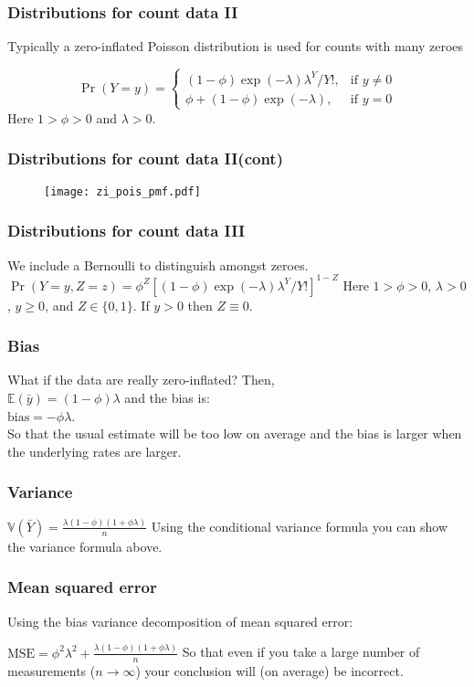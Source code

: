 \documentclass{beamer} %
\theoremstyle{definition} %
\begin{document}
\begin{frame}
\frametitle{Distributions for count data II}
Typically a zero-inflated Poisson distribution is used for counts with many zeroes

$$ \Pr(Y=y)=
\begin{cases}
(1-\phi)\exp(-\lambda)\lambda^Y/Y!, &\text{if }y\neq0 \\
\phi+(1-\phi)\exp(-\lambda), &\text{if }y=0
\end{cases}
$$
Here $1 > \phi > 0$ and $\lambda >0$.
\end{frame}

\begin{frame}
\frametitle{Distributions for count data II(cont)}
\begin{figure}[htb]
\hspace{-.45in}\texttt{[image: zi\_pois\_pmf.pdf]}
\end{figure}
\end{frame}


\begin{frame}
\frametitle{Distributions for count data III}
We include a Bernoulli to distinguish amongst zeroes. \\ 
\vspace{.5in}
$ \Pr(Y=y, Z=z)=
\phi^Z\left[(1-\phi)\exp(-\lambda)\lambda^Y/Y! \right]^{1-Z} 
$ \vspace{.5in}
Here $1 > \phi > 0$, $\lambda >0$, $y \geq 0$, and $Z \in \{0,1\}$. 
If $y>0$ then $Z\equiv0$. 
\end{frame}

\begin{frame}
\frametitle{Bias}
What if the data are really zero-inflated? Then, \\
\pause
$\mathbb{E}(\bar{y}) = (1-\phi)\lambda$ and the bias is: \\
\pause
$\text{bias} = -\phi\lambda$.\\
\pause
So that the usual estimate will be too low on average and the bias is larger when the underlying rates are larger. 
\end{frame}

\begin{frame}
\frametitle{Variance}
$
\mathbb{V}(\bar{Y}) = \frac{\lambda(1-\phi)(1+\phi\lambda)}{n}
$
Using the conditional variance formula you can show the variance formula above.
\end{frame}

\begin{frame}
\frametitle{Mean squared error}
Using the bias variance decomposition of mean squared error:

$
\text{MSE} = \phi^2\lambda^2 + \frac{\lambda(1-\phi)(1+\phi\lambda)}{n}
$
So that even if you take a large number of measurements ($n\to \infty$) your conclusion will (on average) be incorrect. 
\end{frame}
\end{document}
